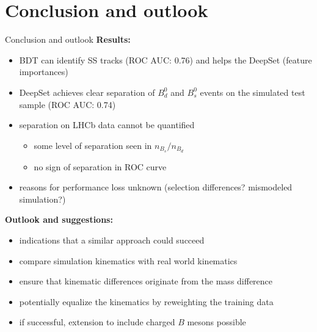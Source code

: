 \documentclass[aspectratio=1610, 10pt]{beamer}
\begin{document}
\section*{Conclusion and outlook}

\begin{frame}{Conclusion and outlook}
  \textbf{Results:}
  \begin{itemize}
    \item BDT can identify SS tracks (ROC AUC: 0.76) and helps the DeepSet (feature importances)
    \item DeepSet achieves clear separation of $B^0_d$ and $B^0_s$ events on the simulated test sample (ROC AUC: 0.74)
    \item separation on LHCb data cannot be quantified
    \begin{itemize}
      \item some level of separation seen in $n_{B_s}/n_{B_d}$
      \item no sign of separation in ROC curve
    \end{itemize}
    \item reasons for performance loss unknown (selection differences? mismodeled simulation?)
  \end{itemize}
  
  \pause
  \medskip
  \textbf{Outlook and suggestions:}
  \begin{itemize}
    \item indications that a similar approach could succeed
    \item compare simulation kinematics with real world kinematics
    \item ensure that kinematic differences originate from the mass difference
    \item potentially equalize the kinematics by reweighting the training data
    \item if successful, extension to include charged $B$ mesons possible
  \end{itemize}
\end{frame}

\appendix
\end{document}
